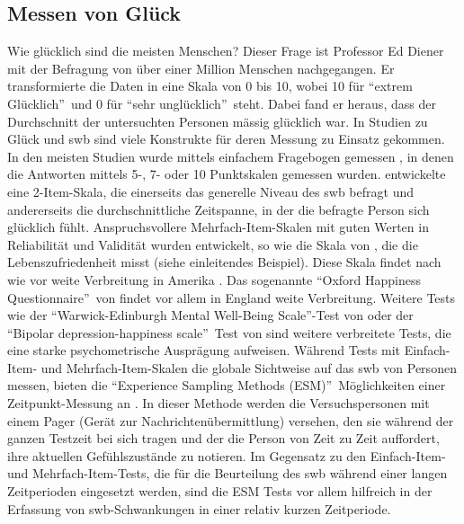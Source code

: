 \subsection{Messen von Glück}\label{subsec.swbMeasuringHappiness}
Wie glücklich sind die meisten Menschen? Dieser Frage ist Professor Ed Diener \citeyear{Myers:1995} mit der Befragung von über einer Million Menschen nachgegangen. Er transformierte die Daten in eine Skala von 0 bis 10, wobei 10 für \textquotedblleft extrem Glücklich\textquotedblright \ und 0 für \textquotedblleft sehr unglücklich\textquotedblright \ steht. Dabei fand er heraus, dass der Durchschnitt der untersuchten Personen mässig glücklich war. \newline
In Studien zu Glück und \gls{swb} sind viele Konstrukte für deren Messung zu Einsatz gekommen. In den meisten Studien wurde mittels einfachem Fragebogen gemessen \cite{Carr:2011}, in denen die Antworten mittels 5-, 7- oder 10 Punktskalen gemessen wurden.  entwickelte eine 2-Item-Skala, die einerseits das generelle Niveau des \gls{swb} befragt und andererseits die durchschnittliche Zeitspanne, in der die befragte Person sich glücklich fühlt. Anspruchsvollere Mehrfach-Item-Skalen mit guten Werten in Reliabilität und Validität wurden entwickelt, so wie die Skala von , die die Lebenszufriedenheit misst (siehe einleitendes Beispiel). Diese Skala findet nach wie vor weite Verbreitung in Amerika \cite{Carr:2011}. Das sogenannte \textquotedblleft Oxford Happiness Questionnaire\textquotedblright \ von  findet vor allem in England weite Verbreitung. Weitere Tests wie der \textquotedblleft Warwick-Edinburgh Mental Well-Being Scale\textquotedblright-Test von  oder der \textquotedblleft Bipolar depression-happiness scale\textquotedblright \ Test von  sind weitere verbreitete Tests, die eine starke psychometrische Ausprägung aufweisen.\newline
Während Tests mit Einfach-Item- und Mehrfach-Item-Skalen die globale Sichtweise auf das \gls{swb} von Personen messen, bieten die \textquotedblleft Experience Sampling Methods (ESM)\textquotedblright \ Möglichkeiten einer Zeitpunkt-Messung an \cite{Hektner:2007}. In dieser Methode werden die Versuchspersonen mit einem Pager (Gerät zur Nachrichtenübermittlung) versehen, den sie während der ganzen Testzeit bei sich tragen und der die Person von Zeit zu Zeit auffordert, ihre aktuellen Gefühlszustände zu notieren. Im Gegensatz zu den Einfach-Item- und Mehrfach-Item-Tests, die für die Beurteilung des \gls{swb} während einer langen Zeitperioden eingesetzt werden, sind die ESM Tests vor allem hilfreich in der Erfassung von \gls{swb}-Schwankungen in einer relativ kurzen Zeitperiode.

